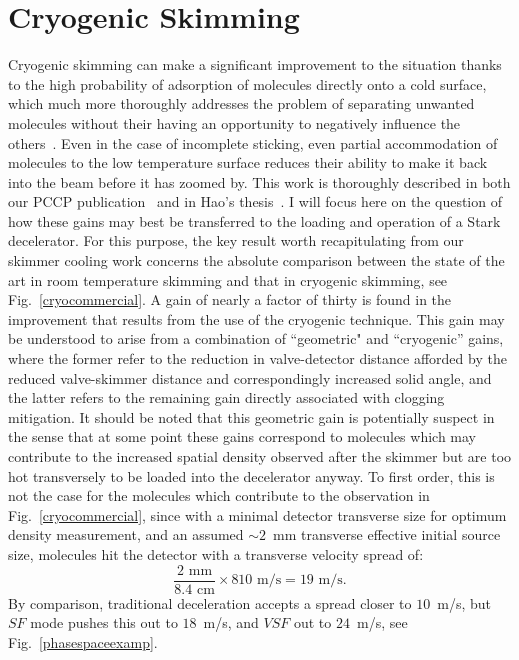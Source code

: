 \section{Cryogenic Skimming}

Cryogenic skimming can make a significant improvement to the situation thanks to the high probability of adsorption of molecules directly onto a cold surface, which much more thoroughly addresses the problem of separating unwanted molecules without their having an opportunity to negatively influence the others~\cite{Segev2017}.
Even in the case of incomplete sticking, even partial accommodation of molecules to the low temperature surface reduces their ability to make it back into the beam before it has zoomed by.
This work is thoroughly described in both our PCCP publication~\cite{Wu2018} and in Hao's thesis~\citep[Chap.~5]{WuThesis2019}.
I will focus here on the question of how these gains may best be transferred to the loading and operation of a Stark decelerator.
For this purpose, the key result worth recapitulating from our skimmer cooling work concerns the absolute comparison between the state of the art in room temperature skimming and that in cryogenic skimming, see Fig.~\ref{cryocommercial}.
A gain of nearly a factor of thirty is found in the improvement that results from the use of the cryogenic technique.
This gain may be understood to arise from a combination of ``geometric" and ``cryogenic'' gains, where the former refer to the reduction in valve-detector distance afforded by the reduced valve-skimmer distance and correspondingly increased solid angle, and the latter refers to the remaining gain directly associated with clogging mitigation.
It should be noted that this geometric gain is potentially suspect in the sense that at some point these gains correspond to molecules which may contribute to the increased spatial density observed after the skimmer but are too hot transversely to be loaded into the decelerator anyway.
To first order, this is not the case for the molecules which contribute to the observation in Fig.~\ref{cryocommercial}, since with a minimal detector transverse size for optimum density measurement, and an assumed $\sim\!2$~mm transverse effective initial source size, molecules hit the detector with a transverse velocity spread of:
\begin{equation}
\frac{2\text{ mm}}{8.4\text{ cm}}\times810\text{ m/s} = 19\text{ m/s}.
\end{equation}
By comparison, traditional deceleration accepts a spread closer to $10$~m/s, but $SF$ mode pushes this out to $18$~m/s, and $VSF$ out to $24$~m/s, see Fig.~\ref{phasespaceexamp}.

